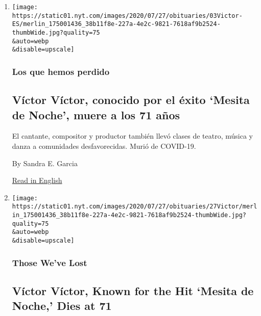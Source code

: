 \begin{enumerate}
\def\labelenumi{\arabic{enumi}.}
\item
  \href{/es/2020/08/03/espanol/cultura/victor-victor-murio-coronavirus.html}{}

  \texttt{[image: https://static01.nyt.com/images/2020/07/27/obituaries/03Victor-ES/merlin\_175001436\_38b11f8e-227a-4e2c-9821-7618af9b2524-thumbWide.jpg?quality=75\\\&auto=webp\\\&disable=upscale]}

  \hypertarget{los-que-hemos-perdido}{%
  \subsubsection{Los que hemos perdido}\label{los-que-hemos-perdido}}

  \hypertarget{vuxedctor-vuxedctor-conocido-por-el-uxe9xito-mesita-de-noche-muere-a-los-71-auxf1os}{%
  \subsection{Víctor Víctor, conocido por el éxito `Mesita de Noche',
  muere a los 71
  años}\label{vuxedctor-vuxedctor-conocido-por-el-uxe9xito-mesita-de-noche-muere-a-los-71-auxf1os}}

  El cantante, compositor y productor también llevó clases de teatro,
  música y danza a comunidades desfavorecidas. Murió de COVID-19.

  By Sandra E. Garcia

  \href{https://www.nytimes.com/2020/08/01/obituaries/victor-victor-dead-coronavirus.html}{Read
  in English}
\item
  \href{/2020/08/01/obituaries/victor-victor-dead-coronavirus.html}{}

  \texttt{[image: https://static01.nyt.com/images/2020/07/27/obituaries/27Victor/merlin\_175001436\_38b11f8e-227a-4e2c-9821-7618af9b2524-thumbWide.jpg?quality=75\\\&auto=webp\\\&disable=upscale]}

  \hypertarget{those-weve-lost}{%
  \subsubsection{Those We've Lost}\label{those-weve-lost}}

  \hypertarget{vuxedctor-vuxedctor-known-for-the-hit-mesita-de-noche-dies-at-71}{%
  \subsection{Víctor Víctor, Known for the Hit `Mesita de Noche,' Dies
  at
  71}\label{vuxedctor-vuxedctor-known-for-the-hit-mesita-de-noche-dies-at-71}}


\end{enumerate}
